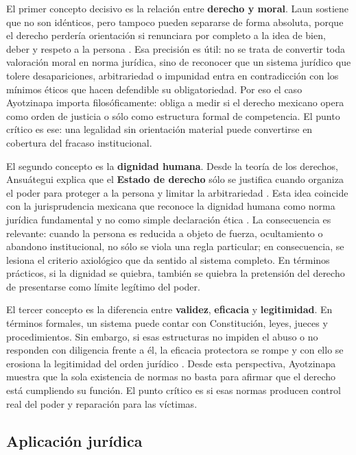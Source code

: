 \documentclass[
	spanish,
	letterpaper, oneside
]{article}
\begin{document}
El primer concepto decisivo es la relación entre \textbf{derecho y moral}. Laun sostiene que no son idénticos, pero tampoco pueden separarse de forma absoluta, porque el derecho perdería orientación si renunciara por completo a la idea de bien, deber y respeto a la persona \citep{launDerechoMoral2021}. Esa precisión es útil: no se trata de convertir toda valoración moral en norma jurídica, sino de reconocer que un sistema jurídico que tolere desapariciones, arbitrariedad o impunidad entra en contradicción con los mínimos éticos que hacen defendible su obligatoriedad. Por eso el caso Ayotzinapa importa filosóficamente: obliga a medir si el derecho mexicano opera como orden de justicia o sólo como estructura formal de competencia. El punto crítico es ese: una legalidad sin orientación material puede convertirse en cobertura del fracaso institucional.

El segundo concepto es la \textbf{dignidad humana}. Desde la teoría de los derechos, Ansuátegui explica que el \textbf{Estado de derecho} sólo se justifica cuando organiza el poder para proteger a la persona y limitar la arbitrariedad \citep{ansuategui2007}. Esta idea coincide con la jurisprudencia mexicana que reconoce la dignidad humana como norma jurídica fundamental y no como simple declaración ética \citep{scjnJur37_2016}. La consecuencia es relevante: cuando la persona es reducida a objeto de fuerza, ocultamiento o abandono institucional, no sólo se viola una regla particular; en consecuencia, se lesiona el criterio axiológico que da sentido al sistema completo. En términos prácticos, si la dignidad se quiebra, también se quiebra la pretensión del derecho de presentarse como límite legítimo del poder.

El tercer concepto es la diferencia entre \textbf{validez}, \textbf{eficacia} y \textbf{legitimidad}. En términos formales, un sistema puede contar con Constitución, leyes, jueces y procedimientos. Sin embargo, si esas estructuras no impiden el abuso o no responden con diligencia frente a él, la eficacia protectora se rompe y con ello se erosiona la legitimidad del orden jurídico \citep{kelsen1982,ansuategui2007}. Desde esta perspectiva, Ayotzinapa muestra que la sola existencia de normas no basta para afirmar que el derecho está cumpliendo su función. El punto crítico es si esas normas producen control real del poder y reparación para las víctimas.

\subsection{Aplicación jurídica}
\end{document}
